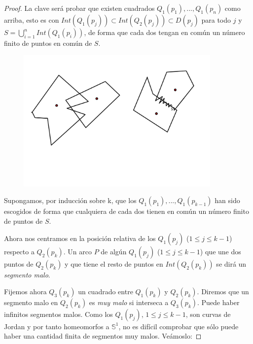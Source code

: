 \begin{proof}
La clave será probar que existen cuadrados  $Q_{1}(p_{1}),...,Q_{1}(p_{n})$  como arriba, esto es con $Int(Q_{1}(p_j)) \subset Int(Q_{2}(p_j))\subset D(p_j)$ para todo $j$ y $S = \bigcup_{i = 1}^{n} Int(Q_{1}(p_{i}))$, de forma que  cada dos   tengan en común un número finito de puntos en común de $S$. 

\begin{figure}[h]
\centering
\begin{minipage}[c]{\textwidth}
\centering
    \includegraphics[width=10.0cm]{images/pic5.jpg}
\end{minipage}
\end{figure}

	Supongamos, por inducción sobre k, que los $Q_{1}(p_{1}),...,Q_{1}(p_{k-1})$ han sido escogidos de forma que cualquiera de cada dos tienen en común un número finito de puntos de $S$. 

	Ahora nos centramos en la posición relativa de los $Q_{1}(p_j)$ ($1 \leq j \leq k-1$) respecto a $Q_{2}(p_k)$. Un arco $P$ de algún $Q_{1}(p_j)$ ($1 \leq j \leq k-1$) que une dos puntos de $Q_{2}(p_k)$ y que tiene el resto de puntos en $Int(Q_{2}(p_k))$ se dirá un 
 {\em segmento malo}. 
 
Fijemos ahora $Q_{3}(p_k)$ un cuadrado entre $Q_{1}(p_k)$ y $Q_{2}(p_k)$. Diremos que  un segmento malo en $Q_{2}(p_k)$ es {\em muy malo} si interseca a $Q_{3}(p_k)$. Puede haber infinitos segmentos malos. Como los $Q_{1}(p_{j})$, $1\leq j\leq k-1$, son curvas de Jordan y por tanto homeomorfos a $\mathbb{S}^1$, no es difícil comprobar que sólo puede haber una cantidad finita de segmentos muy malos. Veámoslo:


\end{proof}
